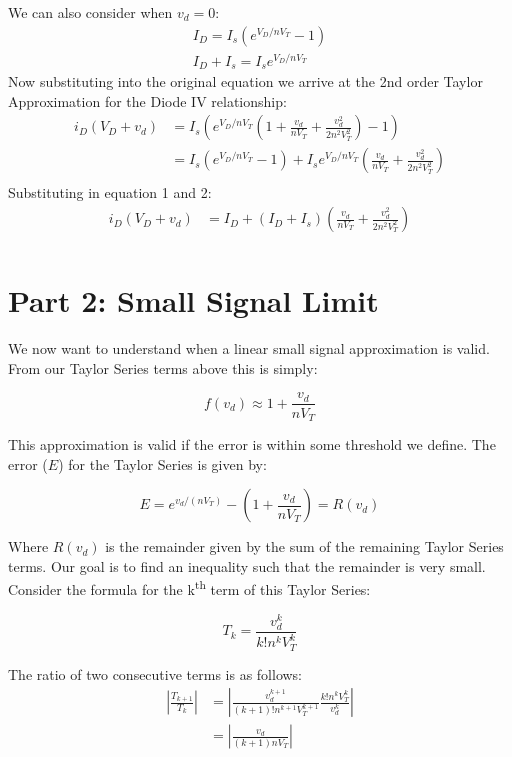 \documentclass[12pt]{article}
\begin{document}
We can also consider when $v_d = 0$:
{
    \begin{align}
        I_D = I_s(e^{V_D/nV_T} - 1) \\
        I_D + I_s = I_se^{V_D/nV_T}
    \end{align}
}
Now substituting into the original equation we arrive at the 2nd order Taylor Approximation for the Diode IV relationship:
{
    \begin{align*}
        i_D(V_D + v_d)
            &= I_s\left(e^{V_D/nV_T}(1 + \frac{v_d}{nV_T} + \frac{v_d^2}{2n^2V_T^2}) - 1\right) \\
            &= I_s(e^{V_D/nV_T} - 1) + I_se^{V_D/nV_T}(\frac{v_d}{nV_T} + \frac{v_d^2}{2n^2V_T^2}) \\
    \end{align*}
}
Substituting in equation 1 and 2:
{
    \begin{align*}
        i_D(V_D + v_d)
            &= I_D + (I_D + I_s)(\frac{v_d}{nV_T} + \frac{v_d^2}{2n^2V_T^2}) \\
    \end{align*}
}

\pagebreak
\section{Part 2: Small Signal Limit}
We now want to understand when a linear small signal approximation is valid. From our Taylor Series terms above this is simply:

$$f(v_d) \approx 1 + \frac{v_d}{nV_T}$$

This approximation is valid if the error is within some threshold we define. The error ($E$) for the Taylor Series is given by:

$$E = e^{v_d/(nV_T)} - (1 + \frac{v_d}{nV_T}) = R(v_d)$$

Where $R(v_d)$ is the remainder given by the sum of the remaining Taylor Series terms. Our goal is to find an inequality such that the remainder is very small. Consider the formula for the k\textsuperscript{th} term of this Taylor Series:

$$T_k =  \frac{v_d^k}{k!n^kV_T^k}$$

The ratio of two consecutive terms is as follows:
{
    \begin{align*}
        |\frac{T_{k+1}}{T_k}| &= |\frac{v_d^{k+1}}{(k+1)!n^{k+1}V_T^{k+1}} \frac{k!n^kV_T^k}{v_d^k}| \\
        &= |\frac{v_d}{(k+1)nV_T}| \\
    \end{align*}
}
\end{document}
